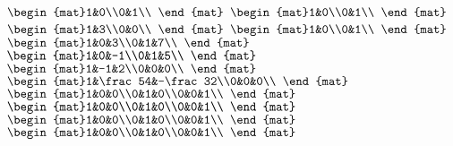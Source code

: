 \begin{Answer}
\Question $\begin{mat}1&0\\0&1\\ \end{mat}$
\Question $\begin{mat}1&0\\0&1\\ \end{mat}$
\Question $\begin{mat}1&3\\0&0\\ \end{mat}$
\Question $\begin{mat}1&0\\0&1\\ \end{mat}$
\Question $\begin{mat}1&0&3\\0&1&7\\ \end{mat}$
\Question $\begin{mat}1&0&-1\\0&1&5\\ \end{mat}$
\Question $\begin{mat}1&-1&2\\0&0&0\\ \end{mat}$
\Question $\begin{mat}1&\frac54&-\frac32\\0&0&0\\ \end{mat}$
\Question $\begin{mat}1&0&0\\0&1&0\\0&0&1\\ \end{mat}$
\Question $\begin{mat}1&0&0\\0&1&0\\0&0&1\\ \end{mat}$
\Question $\begin{mat}1&0&0\\0&1&0\\0&0&1\\ \end{mat}$
\Question $\begin{mat}1&0&0\\0&1&0\\0&0&1\\ \end{mat}$

\end{Answer}
